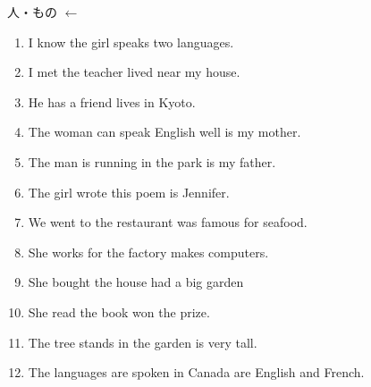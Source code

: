 \documentclass[aspectratio=169,xcolor={dvipsnames,table}]{beamer}
\begin{document}
\begin{frame}[plain,label=ichiran]{人・もの $\leftarrow$ }
 \begin{enumerate}
  \item I know the girl  speaks two languages.%
\mbox{}\hfill{\scriptsize {}}
  \item I met the teacher  lived near my house.
  \item He has a friend  lives in Kyoto.
  \item The woman  can speak English well is my mother.
  \item The man  is running in the park is my father.
  \item The girl  wrote this poem is Jennifer.
  \item We went to the restaurant  was famous for seafood.
  \item She works for the factory  makes computers.
  \item She bought the house  had a big garden
  \item She read the book  won the prize.
  \item The tree  stands in the garden is very tall.
  \item The languages  are spoken in Canada are English and French.
 \end{enumerate}
\end{frame}
\end{document}
